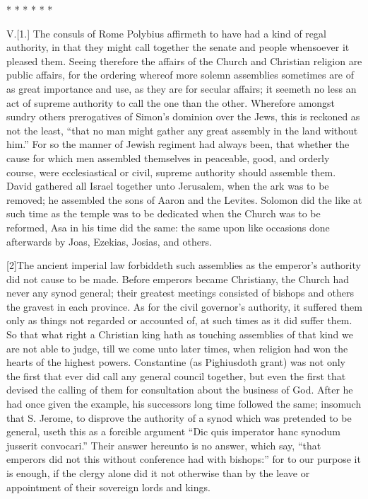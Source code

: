 * * * * * *

V.[1.] The consuls of Rome Polybius affirmeth to have had a kind of regal authority, in that they might call together the senate and people whensoever it pleased them. Seeing therefore the affairs of the Church and Christian religion are public affairs, for the ordering whereof more solemn assemblies sometimes are of as great importance and use, as they are for secular affairs; it seemeth no less an act of supreme authority to call the one than the other. Wherefore amongst sundry others prerogatives of Simon’s dominion over the Jews, this is reckoned as not the least, “that no man might gather any great assembly in the land without him.” For so the manner of Jewish regiment had always been, that whether the cause for which men assembled themselves in peaceable, good, and orderly course, were ecclesiastical or civil, supreme authority should assemble them. David gathered all Israel together unto Jerusalem, when the ark was to be removed; he assembled the sons of Aaron and the Levites. Solomon did the like at such time as the temple was to be dedicated when the Church was to be reformed, Asa in his time did the same: the same upon like occasions done afterwards by Joas, Ezekias, Josias, and others.

[2]The ancient imperial law forbiddeth such assemblies  as the emperor’s authority did not cause to be made. Before emperors became Christiany, the Church had never any synod general; their greatest meetings consisted of bishops and others the gravest in each province. As for the civil governor’s authority, it suffered them only as things not regarded or accounted of, at such times as it did suffer them. So that what right a Christian king hath as touching assemblies of that kind we are not able to judge, till we come unto later times, when religion had won the hearts of the highest powers. Constantine (as Pighiusdoth grant) was not only the first that ever did call any general council together, but even the first that devised the calling of them for consultation about the business of God. After he had once given the example, his successors long time followed the same; insomuch that S. Jerome, to disprove the authority of a synod which was pretended to be general, useth this as a forcible argument “Dic quis imperator hanc synodum jusserit convocari.” Their answer hereunto is no answer, which say, “that emperors did not this without conference had with  bishops:” for to our purpose it is enough, if the clergy alone did it not otherwise than by the leave or appointment of their sovereign lords and kings.

